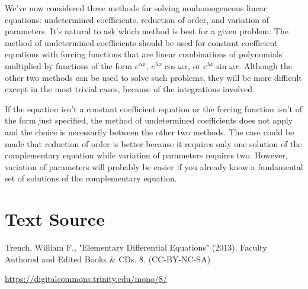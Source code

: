 \documentclass{ximera}
\begin{document}
We've now considered three methods
for solving  nonhomogeneous linear equations: undetermined
coefficients, reduction of order, and variation of parameters. It's
natural to ask which method is best for a given problem. The method of
undetermined coefficients should be used for constant coefficient
equations with forcing functions that are linear combinations of
polynomials multiplied by functions of the form $e^{\alpha x}$,
$e^{\lambda x}\cos \omega x$, or $e^{\lambda x}\sin \omega x$.
Although the other two methods can be used to solve such problems,
they will be more difficult except in the most trivial cases, because
of the integrations involved.
 
If the equation isn't  a constant coefficient equation or the forcing
function isn't  of the form just specified,  the method of
undetermined coefficients does not apply and the choice is necessarily
between the other two methods. The case could be made that reduction
of order is better because it requires only one solution of the
complementary equation while variation of parameters requires two.
However, variation of parameters will probably be easier if you
already know a fundamental set of solutions of the complementary
equation.
 
 
 
\section*{Text Source}
Trench, William F., "Elementary Differential Equations" (2013). Faculty Authored and Edited Books \& CDs. 8. (CC-BY-NC-SA)
 
\href{https://digitalcommons.trinity.edu/mono/8/}{https://digitalcommons.trinity.edu/mono/8/}
 
\end{document}
